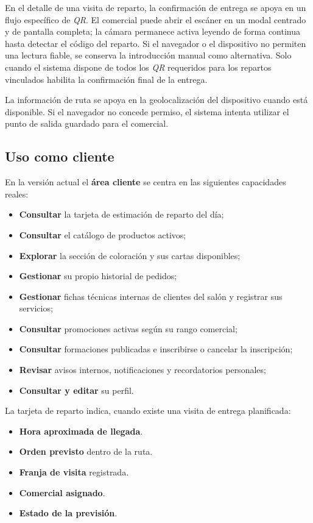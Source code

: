 En el detalle de una visita de reparto, la confirmación de entrega se apoya en un flujo específico de \textit{QR}. El comercial puede abrir el escáner en un modal centrado y de pantalla completa; la cámara permanece activa leyendo de forma continua hasta detectar el código del reparto. Si el navegador o el dispositivo no permiten una lectura fiable, se conserva la introducción manual como alternativa. Solo cuando el sistema dispone de todos los \textit{QR} requeridos para los repartos vinculados habilita la confirmación final de la entrega.

La información de ruta se apoya en la geolocalización del dispositivo cuando está disponible. Si el navegador no concede permiso, el sistema intenta utilizar el punto de salida guardado para el comercial.

\subsection{Uso como cliente}

En la versión actual el \textbf{área cliente} se centra en las siguientes capacidades reales:

\begin{itemize}
    \item \textbf{Consultar} la tarjeta de estimación de reparto del día;
    \item \textbf{Consultar} el catálogo de productos activos;
    \item \textbf{Explorar} la sección de coloración y sus cartas disponibles;
    \item \textbf{Gestionar} su propio historial de pedidos;
    \item \textbf{Gestionar} fichas técnicas internas de clientes del salón y registrar sus servicios;
    \item \textbf{Consultar} promociones activas según su rango comercial;
    \item \textbf{Consultar} formaciones publicadas e inscribirse o cancelar la inscripción;
    \item \textbf{Revisar} avisos internos, notificaciones y recordatorios personales;
    \item \textbf{Consultar y editar} su perfil.
\end{itemize}

La tarjeta de reparto indica, cuando existe una visita de entrega planificada:

\begin{itemize}
    \item \textbf{Hora aproximada de llegada}.
    \item \textbf{Orden previsto} dentro de la ruta.
    \item \textbf{Franja de visita} registrada.
    \item \textbf{Comercial asignado}.
    \item \textbf{Estado de la previsión}.
\end{itemize}

